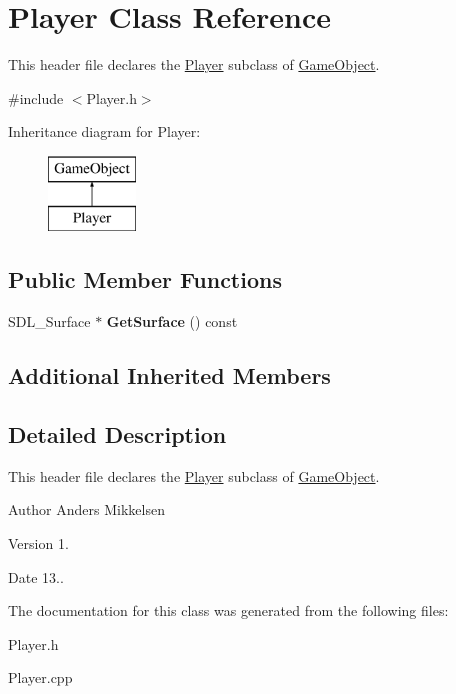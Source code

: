 \hypertarget{class_player}{}\section{Player Class Reference}
\label{class_player}


This header file declares the \hyperlink{class_player}{Player} subclass of \hyperlink{class_game_object}{Game\+Object}.  




{\ttfamily \#include $<$Player.\+h$>$}

Inheritance diagram for Player\+:\begin{figure}[H]
\begin{center}
\leavevmode
\includegraphics[height=2.000000cm]{class_player}
\end{center}
\end{figure}
\subsection*{Public Member Functions}
\begin{DoxyCompactItemize}
\item 
\hypertarget{class_player_a130256f63476010bc4c42b7eb0a61882}{}S\+D\+L\+\_\+\+Surface $\ast$ {\bfseries Get\+Surface} () const \label{class_player_a130256f63476010bc4c42b7eb0a61882}

\end{DoxyCompactItemize}
\subsection*{Additional Inherited Members}


\subsection{Detailed Description}
This header file declares the \hyperlink{class_player}{Player} subclass of \hyperlink{class_game_object}{Game\+Object}. 

\begin{DoxyAuthor}{Author}
Anders Mikkelsen 
\end{DoxyAuthor}
\begin{DoxyVersion}{Version}
1. 
\end{DoxyVersion}
\begin{DoxyDate}{Date}
13.. 
\end{DoxyDate}


The documentation for this class was generated from the following files\+:\begin{DoxyCompactItemize}
\item 
Player.\+h\item 
Player.\+cpp\end{DoxyCompactItemize}
